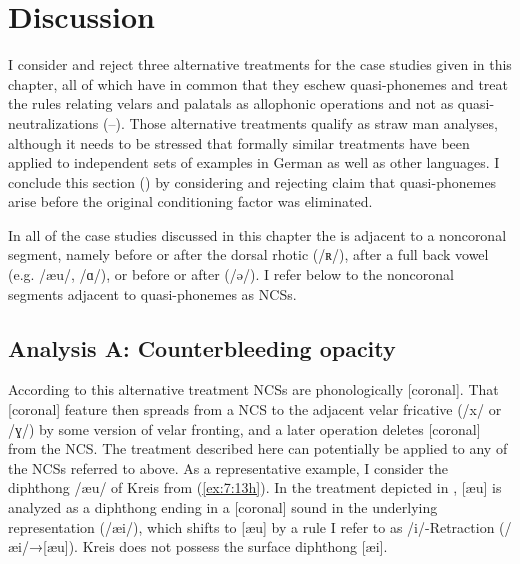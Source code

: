 \section{{Discussion}}\label{sec:7.4}

I consider and reject three alternative treatments for the case studies given in this chapter, all of which have in common that they eschew quasi-phonemes and treat the rules relating velars and palatals as allophonic operations and not as quasi-neutralizations (--). Those alternative treatments qualify as straw man analyses, although it needs to be stressed that formally similar treatments have been applied to independent sets of examples in German as well as other languages. I conclude this section () by considering and rejecting  claim that quasi-phonemes arise before the original conditioning factor was eliminated.

In all of the case studies discussed in this chapter the  is adjacent to a noncoronal segment, namely before or after the dorsal rhotic (/ʀ/), after a full back vowel (e.g. /æu/, /ɑ/), or before or after  (/ə/). I refer below to the noncoronal segments adjacent to quasi-phonemes as NCSs.

\subsection{Analysis A: Counterbleeding opacity}\label{sec:7.4.1}

According to this alternative treatment NCSs are phonologically [coronal]. That [coronal] feature then spreads from a NCS to the adjacent velar fricative (/x/ or /ɣ/) by some version of velar fronting, and a later operation deletes [coronal] from the NCS. The treatment described here can potentially be applied to any of the NCSs referred to above. As a representative example, I consider the diphthong /æu/ of Kreis  from (\ref{ex:7:13h}). In the treatment depicted in , [æu] is analyzed as a diphthong ending in a [coronal] sound in the underlying representation (/æi/), which shifts to [æu] by a rule I refer to as /i/-Retraction (/æi/→[æu]). Kreis  does not possess the surface diphthong [æi].\largerpage

